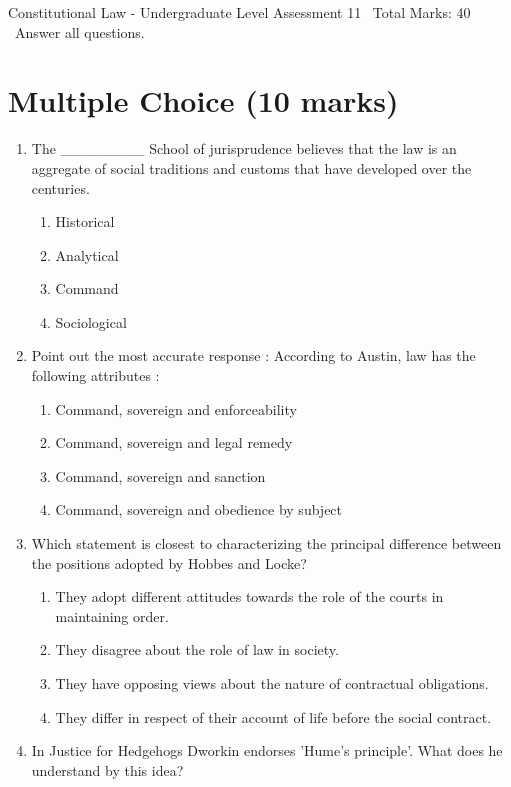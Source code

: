 \documentclass[12pt]{article}
\begin{document}
\begin{center}
Constitutional Law - Undergraduate Level Assessment 11 \
Total Marks: 40 \
Answer all questions.
\end{center}

\section*{Multiple Choice (10 marks)}
\begin{enumerate}[label=\arabic*.]
\item The \_\_\_\_\_\_\_\_ School of jurisprudence believes that the law is an aggregate of social traditions and customs that have developed over the centuries.
\begin{enumerate}[label=(\alph*)]
    \item Historical
    \item Analytical
    \item Command
    \item Sociological
\end{enumerate}
\item Point out the most accurate response : According to Austin, law has the following attributes :
\begin{enumerate}[label=(\alph*)]
    \item Command, sovereign and enforceability
    \item Command, sovereign and legal remedy
    \item Command, sovereign and sanction
    \item Command, sovereign and obedience by subject
\end{enumerate}
\item Which statement is closest to characterizing the principal difference between the positions adopted by Hobbes and Locke?
\begin{enumerate}[label=(\alph*)]
    \item They adopt different attitudes towards the role of the courts in maintaining order.
    \item They disagree about the role of law in society.
    \item They have opposing views about the nature of contractual obligations.
    \item They differ in respect of their account of life before the social contract.
\end{enumerate}
\item In Justice for Hedgehogs Dworkin endorses 'Hume's principle'. What does he understand by this idea?

\end{enumerate}
\end{document}
